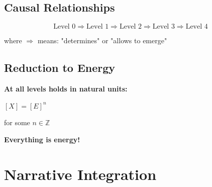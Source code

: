 	\begin{table}[H]
		\centering
		\small
		\caption{The five ontological levels}
	\end{table}
	
	\subsection{Causal Relationships}
	
	\begin{equation}
		\text{Level 0} \Rightarrow \text{Level 1} \Rightarrow \text{Level 2} \Rightarrow \text{Level 3} \Rightarrow \text{Level 4}
	\end{equation}
	
	where $\Rightarrow$ means: "determines" or "allows to emerge"
	
	\subsection{Reduction to Energy}
	
	\begin{center}
		\textbf{At all levels holds in natural units:}
		
		\vspace{0.3cm}
		
		 $[X] = [E]^n$
		
		\vspace{0.3cm}
		
		\normalsize for some $n \in \mathbb{Z}$
	\end{center}
	
	\textbf{Everything is energy!}
	
	\section{Narrative Integration}
	
